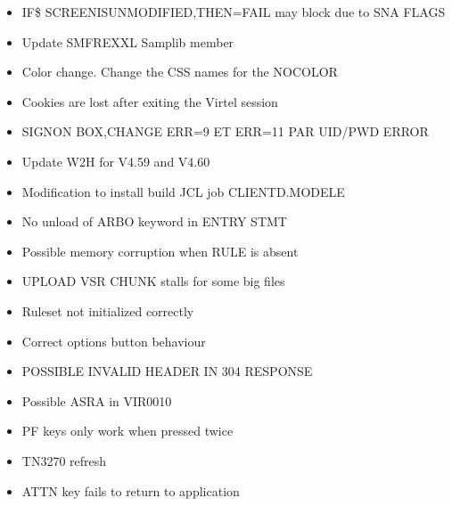 \documentclass[letterpaper,10pt,english]{sphinxmanual}
\begin{document}
\begin{itemize}
\item {} 
 IF\$ SCREEN\sphinxhyphen{}IS\sphinxhyphen{}UNMODIFIED,THEN=FAIL may block due to SNA FLAGS

\item {} 
 Update SMFREXXL Samplib member

\item {} 
 Color change. Change the CSS names for the NOCOLOR

\item {} 
 Cookies are lost after exiting the Virtel session

\item {} 
 SIGNON BOX,CHANGE ERR=9 ET ERR=11 PAR UID/PWD ERROR

\item {} 
 Update W2H for V4.59 and V4.60

\item {} 
 Modification to install build JCL job CLIENTD.MODELE

\item {} 
 No unload of ARBO keyword in ENTRY STMT

\item {} 
 Possible memory corruption when RULE is absent

\item {} 
 UPLOAD VSR CHUNK stalls for some big files

\item {} 
 Ruleset not initialized correctly

\item {} 
 Correct options button behaviour

\item {} 
 POSSIBLE INVALID HEADER IN 304 RESPONSE

\item {} 
 Possible ASRA in VIR0010

\item {} 
 PF keys only work when pressed twice

\item {} 
 TN3270 refresh

\item {} 
 ATTN key fails to return to application


\end{itemize}
\end{document}
